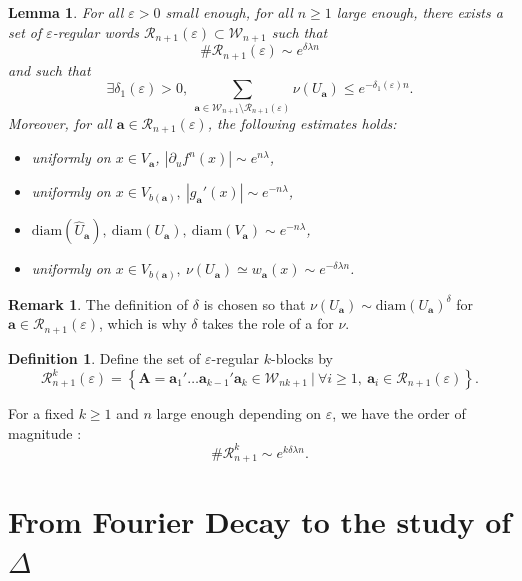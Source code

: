 \documentclass[a4paper]{article}
\newtheorem{lemma}[theorem]{Lemma}
\theoremstyle{definition}
\newtheorem{definition}{Definition}[section]
\newtheorem{remark}[example]{Remark}
\begin{document}
\begin{lemma}\label{lem:mag}
For all $\varepsilon>0$ small enough, for all $n \geq 1$ large enough, there exists a set of $\varepsilon$-regular words $\mathcal{R}_{n+1}(\varepsilon) \subset \mathcal{W}_{n+1}$ such that $$ \# \mathcal{R}_{n+1}(\varepsilon) \sim e^{\delta \lambda n} $$
and such that $$ \exists \delta_1(\varepsilon)>0, \ \sum_{\mathbf{a} \in \mathcal{W}_{n+1} \setminus \mathcal{R}_{n+1}(\varepsilon)} \nu(U_{\mathbf{a}}) \leq e^{-\delta_1(\varepsilon) n} .$$ Moreover, for all $\mathbf{a} \in \mathcal{R}_{n+1}(\varepsilon)$, the following estimates holds:
\begin{itemize}
    \item uniformly on $x \in V_{\mathbf{a}}$,  $|\partial_u f^{n}(x)| \sim e^{n \lambda}$,
    \item uniformly on $x \in V_{b(\mathbf{a})}, \  |g_\mathbf{a}'(x)| \sim e^{- n \lambda}$,
    \item $\mathrm{diam}(\widehat{U}_\mathbf{a}), \ \mathrm{diam}(U_\mathbf{a}), \ \mathrm{diam}(V_{\mathbf{a}})  \sim e^{- n \lambda} $,
    \item uniformly on $x \in V_{b(\mathbf{a})}, \ \nu(U_\textbf{a})  \simeq w_{\mathbf{a}}(x) \sim e^{- \delta \lambda n} $.
\end{itemize}
\end{lemma}

\begin{remark}
The definition of $\delta$ is chosen so that $ \nu(U_{\mathbf{a}}) \sim \text{diam}(U_\mathbf{a})^\delta $ for $\mathbf{a} \in \mathcal{R}_{n+1}(\varepsilon)$, which is why $\delta$ takes the role of a  for $\nu$.
\end{remark}

\begin{definition}
Define the set of $\varepsilon$-regular $k$-blocks by $$ \mathcal{R}_{n+1}^k(\varepsilon) = \left\{ \mathbf{A}=\mathbf{a}_1' \dots \mathbf{a}_{k-1}' \mathbf{a}_k \in \mathcal{W}_{nk+1} \ | \ \forall i \geq 1, \ \mathbf{a}_i \in \mathcal{R}_{n+1}(\varepsilon) \right\} .$$ 
\end{definition}


For a fixed $k \geq 1$ and $n$ large enough depending on $\varepsilon$, we have the order of magnitude \cite{SS20,Le23a}: $$ \# \mathcal{R}_{n+1}^k \sim e^{ k \delta \lambda n} .$$




\section{From Fourier Decay to the study of $\Delta$}\label{sec:3}
\end{document}
